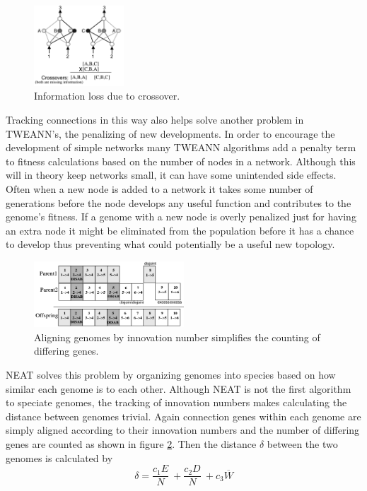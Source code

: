\documentclass[twocolumn,letterpaper]{article}
\begin{document}
\begin{figure}[h]
	\centering
	\includegraphics[width=0.3\textwidth]{images/crossover.png}
	\caption{Information loss due to crossover.}
	\label{fig:crossover_loss}
\end{figure} 

Tracking connections in this way also helps solve another problem in TWEANN's, the penalizing of new
developments. In order to encourage the development of simple networks many TWEANN algorithms add a penalty
term to fitness calculations based on the number of nodes in a network. Although this will in theory keep
networks small, it can have some unintended side effects. Often when a new node is added to a network
it takes some number of generations before the node develops any useful function and contributes to the 
genome's fitness. If a genome with a new node is overly penalized just for having an extra node it might be
eliminated from the population before it has a chance to develop thus preventing what could potentially be a
useful new topology.
\begin{figure}[h]
	\centering
	\includegraphics[width=0.5\textwidth]{images/speciation.png}
	\caption{Aligning genomes by innovation number simplifies the counting of differing genes.}
	\label{fig:speciation}
\end{figure}
NEAT solves this problem by organizing genomes into species based on how similar each genome is to each other.
Although NEAT is not the first algorithm to speciate genomes, the tracking of innovation numbers makes
calculating the distance between genomes trivial. Again connection genes within each genome are simply
aligned according to their innovation numbers and the number of differing genes are counted as shown in figure \ref{fig:speciation}. Then the distance
$\delta$ between the two genomes is calculated by
\begin{equation}
\delta = \frac{c_1E}{N}\ + \frac{c_2D}{N}\ + c_3\overline{W}
\end{equation}
\end{document}
